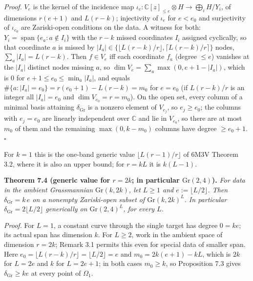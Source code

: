 \documentclass[
  11pt,
  a4paper,
]{article}
\newcounter{none} %
\begin{document}
\emph{Proof.} \(V_e\) is the kernel of the incidence map
\(\iota_e:\mathbb C[z]_{\le e}\otimes H\to\bigoplus_iH/Y_i\), of
dimensions \(r(e+1)\) and \(L(r-k)\); injectivity of \(\iota_e\) for
\(e<e_0\) and surjectivity of \(\iota_{e_0}\) are Zariski-open
conditions on the data. A witness for both:
\(Y_i=\operatorname{span}\{e_a:a\notin I_i\}\) with the \(r-k\) missed
coordinates \(I_i\) assigned cyclically, so that coordinate \(a\) is
missed by \(|I_a|\in\{\lfloor L(r-k)/r\rfloor,\allowbreak{}\lceil L(r-k)/r\rceil\}\)
nodes, \(\sum_a|I_a|=L(r-k)\). Then \(f\in V_e\) iff each coordinate
\(f_a\) (degree \(\le e\)) vanishes at the \(|I_a|\) distinct nodes
missing \(a\), so \(\dim V_e=\sum_a\max(0,\allowbreak{}e+1-|I_a|)\), which is \(0\)
for \(e+1\le e_0\le\min_a|I_a|\), and equals
\(\#\{a:|I_a|=e_0\}=r(e_0+1)-L(r-k)=m_0\) for \(e=e_0\) (if \(L(r-k)/r\)
is an integer all \(|I_a|=e_0\) and \(\dim V_{e_0}=r=m_0\)). On the open
set, every column of a minimal basis attaining \(\delta_{\mathrm{Gr}}\)
is a nonzero element of \(V_{e_j}\), so \(e_j\ge e_0\); the columns with
\(e_j=e_0\) are linearly independent over \(\mathbb C\) and lie in
\(V_{e_0}\), so there are at most \(m_0\) of them and the remaining
\(\max(0,\allowbreak{}k-m_0)\) columns have degree \(\ge e_0+1\). \(\square\)

For \(k=1\) this is the one-band generic value
\(\lfloor L(r-1)/r\rfloor\) of 6M3V Theorem 3.2, where it is also an
upper bound; for \(r=kL\) it is \(k(L-1)\).

\textbf{Theorem 7.4 (generic value for \(r=2k\); in particular
\(\mathrm{Gr}(2,\allowbreak{}4)\)).} \emph{For data in the ambient Grassmannian
\(\mathrm{Gr}(k,\allowbreak{}2k)\), let \(L\ge1\) and \(e:=\lfloor L/2\rfloor\). Then
\(\delta_{\mathrm{Gr}}=k\,\allowbreak{}e\) on a nonempty Zariski-open subset of
\(\mathrm{Gr}(k,\allowbreak{}2k)^L\). In particular
\(\delta_{\mathrm{Gr}}=2\lfloor L/2\rfloor\) generically on
\(\mathrm{Gr}(2,\allowbreak{}4)^L\), for every \(L\).}

\emph{Proof.} For \(L=1\), a constant curve through the single target
has degree \(0=ke\); its actual span has dimension \(k\). For \(L\ge2\),
work in the ambient space of dimension \(r=2k\); Remark 3.1 permits this
even for special data of smaller span. Here
\(e_0=\lfloor L(r-k)/r\rfloor=\lfloor L/2\rfloor=e\) and
\(m_0=2k(e+1)-kL\), which is \(2k\) for \(L=2e\) and \(k\) for
\(L=2e+1\); in both cases \(m_0\ge k\), so Proposition 7.3 gives
\(\delta_{\mathrm{Gr}}\ge ke\) at every point of \(\Omega_1\).
\end{document}

